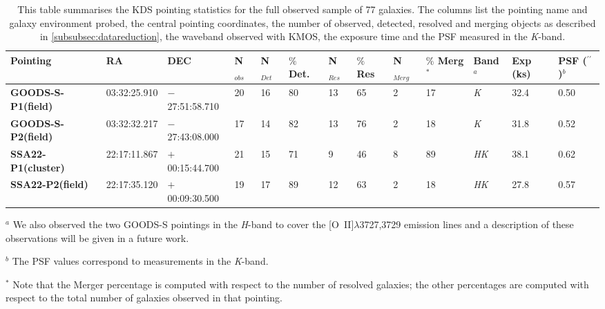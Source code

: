 \documentclass[fleqn,usenatbib]{mnras}
\begin{document}
\begin{table*}
\centering
\begin{threeparttable}
\caption{This table summarises the KDS pointing statistics for the full observed sample of 77 galaxies.
The columns list the pointing name and galaxy environment probed, the central pointing coordinates, the number of observed, detected, resolved and merging objects as described in \protect\cref{subsubsec:datareduction}, the waveband observed with KMOS, the exposure time and the PSF measured in the {\it K}-band.}
\label{tab:pointings}
\begin{tabular}{l l l l l l l l l l l l l}

 \hline
Pointing & RA & DEC & N$_{obs}$ & N$_{Det}$ & $\%$ Det. & N$_{Res}$ & $\%$ Res & N$_{Merg}$ & $\%$ Merg$^{*}$ & Band$^{a}$ & Exp (ks) & PSF ($^{\prime\prime}$)$^{b}$  \\
 \hline
 \scriptsize{\bf GOODS-S-P1(field)} & 03:32:25.910 & $-$27:51:58.710 & 20 & 16 & 80 & 13 & 65 & 2 & 17 & {\it K} & 32.4 & 0.50 \\
\scriptsize{\bf GOODS-S-P2(field)} & 03:32:32.217 & $-$27:43:08.000 & 17 & 14 & 82 & 13 & 76 & 2 & 18 & {\it K} & 31.8 & 0.52 \\
\scriptsize{\bf SSA22-P1(cluster)} & 22:17:11.867 & $+$00:15:44.700 & 21 & 15 & 71 & 9 & 46 & 8 & 89 & {\it HK} & 38.1 & 0.62 \\
\scriptsize{\bf SSA22-P2(field)} & 22:17:35.120 & $+$00:09:30.500 & 19 & 17 & 89 & 12 & 63 & 2 & 18 & {\it HK} & 27.8 & 0.57 \\

 \hline
\end{tabular}
\begin{tablenotes}
      \small
      \item $^{a}$ We also observed the two GOODS-S pointings in the {\it H}-band to cover the [O~{\sc II}]$\lambda$3727,3729 emission lines and a description of these observations will be given in a future work.
      \item $^{b}$ The PSF values correspond to measurements in the {\it K}-band.
      \item $^{*}$ Note that the Merger percentage is computed with respect to the number of resolved galaxies; the other percentages are computed with respect to the total number of galaxies observed in that pointing.
    \end{tablenotes}
  \end{threeparttable}
  \end{table*}
\end{document}
